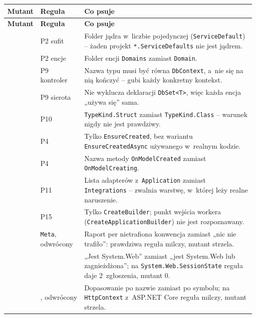 \begingroup\footnotesize
\begin{xltabular}{\linewidth}{@{}>{\raggedright\arraybackslash}p{6.9cm} >{\raggedright\arraybackslash}p{2.6cm} >{\raggedright\arraybackslash}X@{}}
\toprule
\textbf{Mutant} & \textbf{Reguła} & \textbf{Co psuje} \\
\midrule
\endfirsthead
\toprule
\textbf{Mutant} & \textbf{Reguła} & \textbf{Co psuje} \\
\midrule
\endhead
{} & P2 sufit & Folder jądra w~liczbie pojedynczej (\texttt{ServiceDefault}) -- żaden projekt \texttt{*.ServiceDefaults} nie jest jądrem. \\
 & P2 encje & Folder encji \texttt{Domains} zamiast \texttt{Domain}. \\
 & P9 kontroler & Nazwa typu musi być równa \texttt{DbContext}, a~nie się na nią kończyć -- gubi każdy konkretny kontekst. \\
 & P9 sierota & Nie wyklucza deklaracji \texttt{DbSet<T>}, więc każda encja „używa się” sama. \\
 & P10 & \texttt{TypeKind.Struct} zamiast \texttt{TypeKind.Class} -- warunek nigdy nie jest prawdziwy. \\
 & P4 & Tylko \texttt{EnsureCreated}, bez wariantu \texttt{EnsureCreatedAsync} używanego w~realnym kodzie. \\
 & P4 & Nazwa metody \texttt{OnModelCreated} zamiast \texttt{OnModelCreating}. \\
 & P11 & Lista adapterów z~\texttt{Application} zamiast \texttt{Integrations} -- zwalnia warstwę, w~której leży realne naruszenie. \\
 & P15 & Tylko \texttt{CreateBuilder}; punkt wejścia workera (\texttt{CreateApplicationBuilder}) nie jest rozpoznawany. \\
 & \texttt{Meta}, odwrócony & Raport per nietrafiona konwencja zamiast „nic nie trafiło”: prawdziwa reguła milczy, mutant strzela. \\
 &  & „Jest System.Web” zamiast „jest System.Web lub zagnieżdżona”; na \texttt{System.Web.SessionState} reguła daje 2~zgłoszenia, mutant 0. \\
 & , odwrócony & Dopasowanie po nazwie zamiast po symbolu; na \texttt{HttpContext} z~ASP.NET Core reguła milczy, mutant strzela. \\

\end{xltabular}
